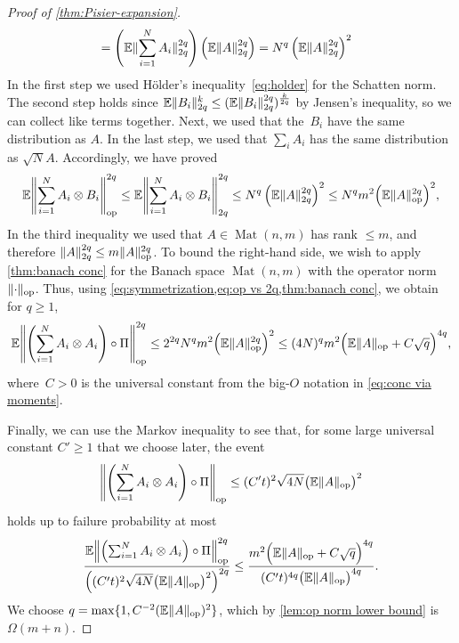 \documentclass[aos]{imsart}
\theoremstyle{definition}
\numberwithin{equation}{section}
\DeclareMathOperator{\op}{op}
\DeclareMathOperator{\Mat}{Mat}
\DeclarePairedDelimiter{\norm}{\lVert}{\rVert}
\newcommand{\ot}{\otimes}
\newcommand{\E}{\mathbb{E}}
\begin{document}
\begin{appendix}
\begin{proof} [Proof of \cref{thm:Pisier-expansion}]
\begin{align*}
&= \left( \E\norm{\sum_{i=1}^N A_i}_{2q}^{2q} \right) \left( \E \norm{ A }_{2q}^{2q} \right)
= N^q \left( \E\norm{A}_{2q}^{2q} \right)^2
\end{align*}
In the first step we used H\"older's inequality~\eqref{eq:holder} for the Schatten norm.
The second step holds since $\E\norm{B_i}_{2q}^k \leq (\E \norm{B_i}_{2q}^{2q})^{\frac k {2q}}$ by Jensen's inequality, so we can collect like terms together.
Next, we used that the~$B_i$ have the same distribution as $A$.
In the last step, we used that $\sum_i A_i$ has the same distribution as $\sqrt N A$.
Accordingly, we have proved
\begin{align}\label{eq:op vs 2q}
\E \norm*{\sum_{i=1}^N A_i \ot B_i}_{\op}^{2q}
\leq \E \norm*{\sum_{i=1}^N A_i \ot B_i}_{2q}^{2q}
\leq N^q \left( \E\norm{A}_{2q}^{2q} \right)^2
\leq N^q m^2 \Bigl( \E\norm{A}_{\op}^{2q} \Bigr)^2,
\end{align}
In the third inequality we used that $A \in \Mat(n,m)$ has rank $\leq m$, and therefore $\norm{A}_{2q}^{2q} \leq m \norm A_{\op}^{2q}$.
To bound the right-hand side, we wish to apply \cref{thm:banach conc} for the Banach space $\Mat(n,m)$ with the operator norm~$\norm{\cdot}_{\op}$.
Thus, using \cref{eq:symmetrization,eq:op vs 2q,thm:banach conc}, we obtain for $q\geq1$,
\begin{align*}
\E \norm*{\left( \sum_{i=1}^N A_i \otimes A_i \right) \circ \Pi}_{\op}^{2q}
\leq 2^{2q} N^q m^2 \Bigl( \E\norm{A}_{\op}^{2q} \Bigr)^2
\leq (4 N)^q m^2 \Bigl( \E\norm A_{\op} + C \sqrt{q} \Bigr)^{4q},
\end{align*}
where~$C>0$ is the universal constant from the big-$O$ notation in \cref{eq:conc via moments}.

 Finally, we can use the Markov inequality to see that, for some large universal constant $C' \geq 1$ that we choose later, the event
\begin{align*}
  \norm*{\left(\sum_{i=1}^N A_i \otimes A_i \right) \circ \Pi}_{\op} \leq (C' t)^2 \sqrt{4 N} \bigl( \E \norm{A}_{\op} \bigr)^2
\end{align*}
holds up to failure probability at most
\begin{align*}
  \frac{\E \norm*{\left(\sum_{i=1}^N A_i \otimes A_i \right) \circ \Pi}_{\op}^{2q}}{\left( (C' t)^2 \sqrt{4 N} \bigl( \E \norm{A}_{\op} \bigr)^2 \right)^{2q}}
\leq %
  \frac{m^2 \Bigl( \E\norm A_{\op} + C \sqrt{q} \Bigr)^{4q}}{(C' t)^{4q} \bigl( \E \norm{A}_{\op} \bigr)^{4q}}.
\end{align*}
We choose $q = \max\{1, C^{-2} (\E \norm{A}_{\op})^{2} \}$, which by \cref{lem:op norm lower bound} is $\Omega(m + n)$. 


\end{proof}
\end{appendix}
\end{document}
